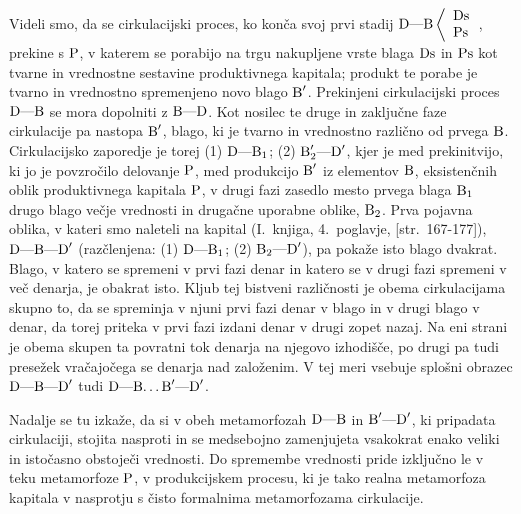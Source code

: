 \documentclass[kapital_02.tex]{subfiles}
\begin{document}
Videli smo, da se cirkulacijski proces, ko konča svoj prvi stadij \( 
    \textrm{D}\textrm{---}\textrm{B}\left< 
    \begin{array}{l}
        \textrm{Ds}\\
        \textrm{Ps}\\
    \end{array}
    \right. 
\), prekine s \( \textrm{P} \), v katerem se porabijo na trgu nakupljene vrste blaga \( \textrm{Ds} \) in \( \textrm{Ps} \) kot tvarne in vrednostne sestavine produktivnega kapitala; produkt te porabe je tvarno in vrednostno spremenjeno novo blago \( \textrm{B}' \). Prekinjeni cirkulacijski proces \( \textrm{D}\textrm{---}\textrm{B} \) se mora dopolniti z \( \textrm{B}\textrm{---}\textrm{D} \). Kot nosilec te druge in zaključne faze cirkulacije pa nastopa \( \textrm{B}' \), blago, ki je tvarno in vrednostno različno od prvega \( \textrm{B} \). Cirkulacijsko zaporedje je torej (1) \( \textrm{D}\textrm{---}\textrm{B}_1 \); (2) \( \textrm{B}'_2\textrm{---}\textrm{D}' \), kjer je med prekinitvijo, ki jo je povzročilo delovanje \( \textrm{P} \), med produkcijo \( \textrm{B}' \) iz elementov \( \textrm{B} \), eksistenčnih oblik produktivnega kapitala \( \textrm{P} \), v drugi fazi zasedlo mesto prvega blaga \( \textrm{B}_1 \) drugo blago večje vrednosti in drugačne uporabne oblike, \( \textrm{B}_2 \). Prva pojavna oblika, v kateri smo naleteli na kapital (I.~knjiga, 4.~poglavje, [str.\ 167-177]), \( \textrm{D}\textrm{---}\textrm{B}\textrm{---}\textrm{D}' \) (razčlenjena: (1) \( \textrm{D}\textrm{---}\textrm{B}_1 \); (2) \( \textrm{B}_2\textrm{---}\textrm{D}' \)), pa pokaže isto blago dvakrat. Blago, v katero se spremeni v prvi fazi denar in katero se v drugi fazi spremeni v več denarja, je obakrat isto. Kljub tej bistveni različnosti je obema cirkulacijama skupno to, da se spreminja v njuni prvi fazi denar v blago in v drugi blago v denar, da torej priteka v prvi fazi izdani denar v drugi zopet nazaj. Na eni strani je obema skupen ta povratni tok denarja na njegovo izhodišče, po drugi pa tudi presežek vračajočega se denarja nad založenim. V tej meri vsebuje splošni obrazec \( \textrm{D}\textrm{---}\textrm{B}\textrm{---}\textrm{D}' \) tudi \( \textrm{D}\textrm{---}\textrm{B}\textrm{\dots}\textrm{B}'\textrm{---}\textrm{D}' \).

Nadalje se tu izkaže, da si v obeh metamorfozah \( \textrm{D}\textrm{---}\textrm{B} \) in \( \textrm{B}'\textrm{---}\textrm{D}' \), ki pripadata cirkulaciji, stojita nasproti in se medsebojno zamenjujeta vsakokrat enako veliki in istočasno obstoječi vrednosti. Do spremembe vrednosti pride izključno le v teku metamorfoze \( \textrm{P} \), v produkcijskem procesu, ki je tako realna metamorfoza kapitala v nasprotju s čisto formalnima metamorfozama cirkulacije.
\end{document}
